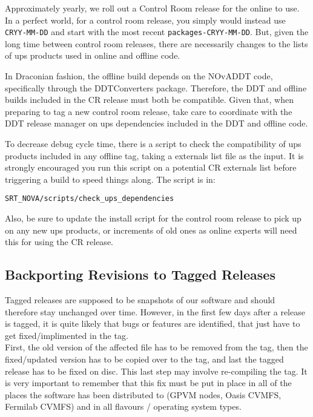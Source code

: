 \documentclass[letterpaper,10pt]{article}
\begin{document}
\noindent
Approximately yearly, we roll out a Control Room release for the online to use.  In a perfect world, for a control room release, you simply would instead use \verb|CRYY-MM-DD| and start with the most recent \verb|packages-CRYY-MM-DD|.  But, given the long time between control room releases, there are necessarily changes to the lists of ups products used in online and offline code.

In Draconian fashion, the offline build depends on the NOvADDT code, specifically through the DDTConverters package.  Therefore, the DDT and offline builds included in the CR release must both be compatible.  Given that, when preparing to tag a new control room release, take care to coordinate with the DDT release manager on ups dependencies included in the DDT and offline code.

To decrease debug cycle time, there is a script to check the compatibility of ups products included in any offline tag, taking a externals list file as the input.  It is strongly encouraged you run this script on a potential CR externals list before triggering a build to speed things along.  The script is in:
\begin{verbatim}
SRT_NOVA/scripts/check_ups_dependencies
\end{verbatim}

Also, be sure to update the install script for the control room release to pick up on any new ups products, or increments of old ones as online experts will need this for using the CR release.


\subsection{Backporting Revisions to Tagged Releases}

Tagged releases are supposed to be snapshots of our software and should therefore stay unchanged over time. However, in the first few days after a release is tagged, it is quite likely that bugs or features are identified, that just have to get fixed/implimented in the tag. \\

\noindent
First, the old version of the affected file has to be removed from the tag, then the fixed/updated version has to be copied over to the tag, and last the tagged release has to be fixed on disc. This last step may involve re-compiling the tag. It is very important to remember that this fix must be put in place in all of the places the software has been distributed to (GPVM nodes, Oasis CVMFS, Fermilab CVMFS) and in all flavours / operating system types. \\
\end{document}
